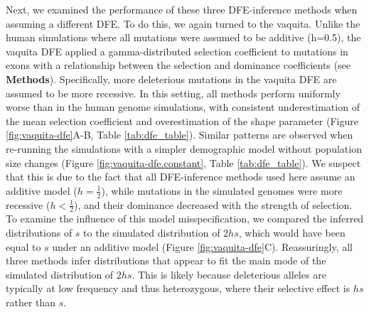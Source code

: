 \documentclass[hidelinks]{article}
\begin{document}
    Next, we examined the performance of these three DFE-inference methods when assuming a different DFE. To do this, we again turned to the vaquita. Unlike the human simulations where all mutations were assumed to be additive (h=0.5), the vaquita DFE applied a gamma-distributed selection coefficient to mutations in exons
    with a relationship between the selection and dominance coefficients (see \textbf{Methods}). Specifically, more deleterious mutations in the vaquita DFE are assumed to be more recessive. 
    In this setting, all methods perform uniformly worse than in the human genome simulations,
    with consistent underestimation of the mean selection coefficient
    and overestimation of the shape parameter (Figure \ref{fig:vaquita-dfe}A-B, Table \ref{tab:dfe_table}).
    Similar patterns are observed when re-running the simulations with a simpler demographic model
    without population size changes (Figure \ref{fig:vaquita-dfe.constant}, Table \ref{tab:dfe_table}).
    We suspect that this is due to the fact that all DFE-inference methods used here assume an additive model ($h = \frac{1}{2}$),
    while mutations in the simulated genomes were more recessive ($h < \frac{1}{2}$), and their dominance decreased with the strength of selection.
    To examine the influence of this model misspecification, we compared the inferred distributions of $s$ to the
    simulated distribution of $2hs$, which would have been equal to $s$ under an additive model (Figure \ref{fig:vaquita-dfe}C).
    Reassuringly, all three methods infer distributions that appear to fit the main mode of the simulated distribution of $2hs$.
    This is likely because deleterious alleles are typically at low frequency and thus heterozygous,
    where their selective effect is $h s$ rather than $s$.
\end{document}
